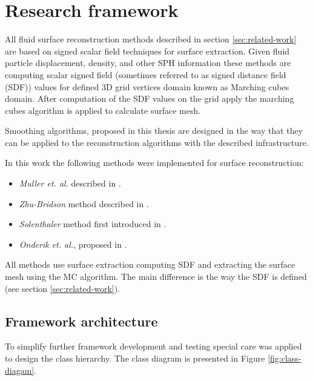 \chapter{Research framework}
All fluid surface reconstruction methods described in section \ref{sec:related-work} are based on signed scalar field techniques for surface extraction. Given fluid particle displacement, density, and other SPH information these methods are computing scalar signed field (sometimes referred to as signed distance field (SDF)) values for defined 3D grid vertices domain known as Marching cubes domain. After computation of the SDF values on the grid apply the marching cubes algorithm is applied to calculate surface mesh.

Smoothing algorithms, proposed in this thesis are designed in the way that they can be applied to the reconstruction algorithms with the described infrastructure.

In this work the following methods were implemented for surface reconstruction:
\begin{itemize}
  \item \emph{Muller et. al.} described in \cite{Muller}.
  \item \emph{Zhu-Bridson} method described in \cite{ZhuBridson}.
  \item \emph{Solenthaler} method first introduced in \cite{Solenthaler}.
  \item \emph{Onderik et. al.}, proposed in \cite{OnderikEtAl}.
\end{itemize}
All methods use surface extraction computing SDF and extracting the surface mesh using the MC algorithm. The main difference is the way the SDF is defined (see section \ref{sec:related-work}).

\section{Framework architecture}
To simplify further framework development and testing special care was applied to design the class hierarchy. The class diagram is presented in Figure \ref{fig:class-diagam}.

